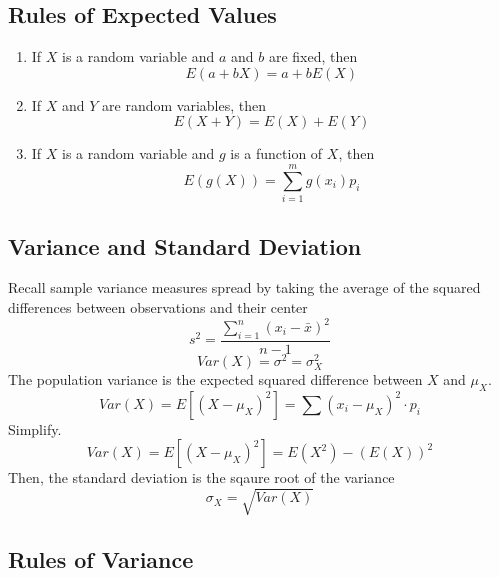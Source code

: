         \subsection{Rules of Expected Values}  %
            \begin{enumerate}
                \item If $X$ is a random variable and $a$ and $b$ are fixed, then
                \[E(a+bX)=a+bE(X)\]
                \item If $X$ and $Y$ are random variables, then
                \[E(X+Y)=E(X)+E(Y)\]
                \item If $X$ is a random variable and $g$ is a function of $X$, then
                \[E(g(X))=\sum_{i=1}^m g(x_i)p_i\]
            \end{enumerate}

        \subsection{Variance and Standard Deviation}  %
            Recall sample variance measures spread by taking the average of the squared differences between observations and their center
            \begin{equation}
                s^2=\frac{\sum_{i=1}^{n}{(x_i-\bar{x})}^2}{n-1}
            \end{equation}
            \begin{equation}
                Var(X)=\sigma^2 = \sigma_X^2
            \end{equation}
            The population variance is the expected squared difference between $X$ and $\mu_X$.
            \begin{equation}
                Var(X)=E[{(X-\mu_X)}^2]=\sum{(x_i-\mu_X)}^2\cdot p_i
            \end{equation}
            Simplify.
            \begin{equation}
                Var(X)=E[{(X-\mu_X)}^2]=E(X^2)-(E(X))^2
            \end{equation}
            Then, the standard deviation is the sqaure root of the variance
            \begin{equation}
                \sigma_X=\sqrt{Var(X)}
            \end{equation}

        \subsection{Rules of Variance}  %

